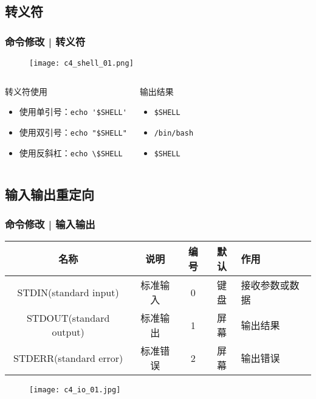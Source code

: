 \subsection{转义符}
\begin{frame}[fragile]
  \frametitle{命令修改 | \alert{转义符}}
  \begin{figure}
    \centering
    \texttt{[image: c4\_shell\_01.png]}
  \end{figure}
  \pause
  \vspace{-1em}
  \begin{columns}
  \begin{block}{转义符使用}
    \begin{itemize}
      \item 使用单引号：\verb|echo '$SHELL'|
      \item 使用双引号：\verb|echo "$SHELL"|
      \item 使用反斜杠：\verb|echo \$SHELL|
    \end{itemize}
  \end{block}
    \pause
    \pause
    \begin{block}{输出结果}
      \begin{itemize}
        \item \verb|$SHELL|
        \item \verb|/bin/bash|
        \item \verb|$SHELL|
      \end{itemize}
    \end{block}
  \end{columns}
\end{frame}

\subsection{输入输出重定向}
\begin{frame}
  \frametitle{命令修改 | \alert{输入输出}}
  \begin{table}
    \centering
    \begin{tabular}{ccccl}
      \hline
      \rowcolor{blue!50}名称 & 说明 & 编号 & 默认 & 作用\\
      \hline
      STDIN(standard input) & 标准输入 & 0 & 键盘 & 接收参数或数据\\
      STDOUT(standard output) & 标准输出 & 1 & 屏幕 & 输出结果\\
      STDERR(standard error) & 标准错误 & 2 & 屏幕 & 输出错误\\
      \hline
    \end{tabular}
  \end{table}
  \begin{figure}
    \centering
    \texttt{[image: c4\_io\_01.jpg]}
  \end{figure}
\end{frame}

